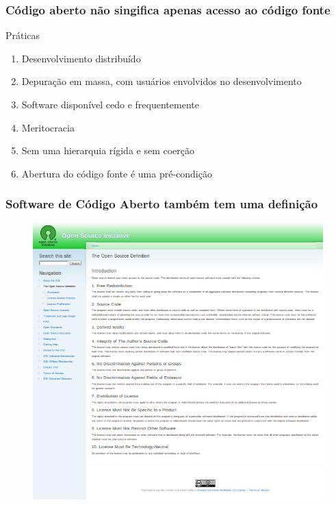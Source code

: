 \documentclass[xcolor=dvipsnames]{beamer}
\begin{document}
\begin{frame}
	\frametitle{Código aberto não singifica apenas acesso ao código fonte}
	\begin{block}{Práticas}
    \begin{enumerate}
      \item Desenvolvimento distribuído %
      \item Depuração em massa, com usuários envolvidos no desenvolvimento 
      \item Software disponível cedo e frequentemente %
      \item Meritocracia %
      \item Sem uma hierarquia rígida e sem coerção
      \item Abertura do código fonte é uma pré-condição
    \end{enumerate}
 	\end{block}
\end{frame}


\begin{frame}
	\frametitle{Software de Código Aberto também tem uma definição}
	\begin{figure}
	\includegraphics[scale=0.35]{osd.png}
	\end{figure}

	\end{frame}
\end{document}

